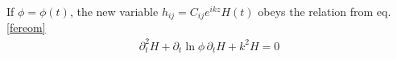 \documentclass[
 jor,
 amsmath,amssymb,preprint,
]{revtex4-2}
\begin{document}
\begin{comment}
\end{aligned}
\end{equation}
Therefore the GW is
\begin{equation}
\begin{aligned}
h^{(o)}_{ab}(\omega) = &  \sqrt{\frac{G_o}{G_s}}\exp\bigg[- \frac{\alpha e^{-z/\lambda}}{2(1+4\omega^2\lambda^2)^2} \bigg(1 + \frac{z}{\lambda} -4\omega^2\lambda^2(1 - \frac{z}{\lambda})\bigg)\bigg] \\
& \times \exp\bigg[- i k z\frac{\alpha e^{-z/\lambda}}{(1+4\omega^2\lambda^2)^2} \bigg(1 + \frac{2\lambda}{z} + 4\omega^2\lambda^2\bigg) \bigg] h_{ab}^{(s)}(\omega) \,. \label{spesptsol}
\end{aligned}
\end{equation}
Furthermore if $\omega \lambda \gg 1$, the eq.\eqref{spesptsol} becomes
\begin{equation}
\begin{aligned}
h^{(o)}_{ab}(\omega) = &  \sqrt{\frac{G_o}{G_s}}\exp\bigg[\frac{\alpha}{8\omega^2\lambda^2} \bigg(1 - \frac{z}{\lambda}\bigg)e^{-z/\lambda} \bigg] \exp\bigg[- i k z\frac{\alpha e^{-z/\lambda}}{4\omega^2\lambda^2} \bigg] h_{ab}^{(s)}(\omega) \\
= & \sqrt{\frac{G_o}{G_s}}\exp\bigg[-\frac{\partial_z^2 \ln G_o}{8\lambda^2} \bigg] \exp\bigg[- i k z\frac{\alpha e^{-z/\lambda}}{4\omega^2\lambda^2} \bigg] h_{ab}^{(s)}(\omega) \,.
\end{aligned}
\end{equation}
\end{comment}
If $\phi = \phi(t)$, the new variable $h_{ij} = C_{ij}e^{ikz}H(t)$ obeys the relation from eq.\eqref{fereom}
\begin{align}
\partial_t^2 H + \partial_t\ln\phi \,\partial_t H  + k^2H= 0
\end{align}
\end{document}
